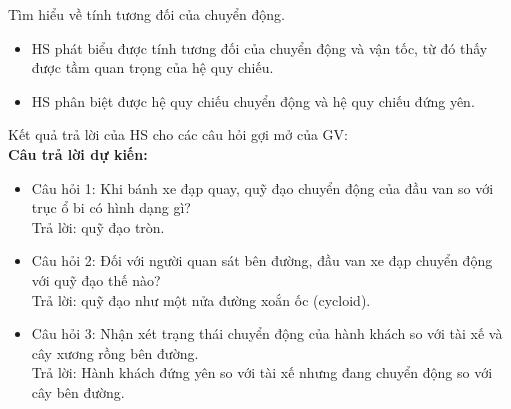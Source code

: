 \hoatdong
{Tìm hiểu về tính tương đối của chuyển động.	
}
{\begin{itemize}
		\item HS phát biểu được tính tương đối của chuyển động và vận tốc, từ đó thấy được tầm quan trọng của hệ quy chiếu.
		\item HS phân biệt được hệ quy chiếu chuyển động và hệ quy chiếu đứng yên.
	\end{itemize}
	
}
{
		Kết quả trả lời của HS cho các câu hỏi gợi mở của GV:\\
	\textbf{Câu trả lời dự kiến:} 
	\begin{itemize}
		\item Câu hỏi 1: Khi bánh xe đạp quay, quỹ đạo chuyển động của đầu van so với trục ổ bi có hình dạng gì?\\
		Trả lời: quỹ đạo tròn.
		\item Câu hỏi 2: Đối với người quan sát bên đường, đầu van xe đạp chuyển động với quỹ đạo thế nào?\\
		Trả lời: quỹ đạo như một nửa đường xoắn ốc (cycloid).
		\item Câu hỏi 3: Nhận xét trạng thái chuyển động của hành khách so với tài xế và cây xương rồng bên đường.\\
		Trả lời: Hành khách đứng yên so với tài xế nhưng đang chuyển động so với cây bên đường.
	\end{itemize}
}
